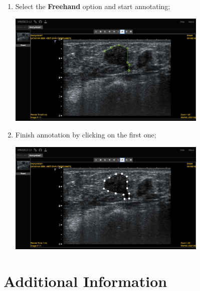 \documentclass{tufte-book} %
\begin{document}
\begin{enumerate}

\item Select the \textbf{Freehand} option and start annotating;

\begin{center}
\includegraphics[width=0.75\textwidth]{graphics/anon1_annotations_start.png}
\end{center}

\item Finish annotation by clicking on the first one;

\begin{center}
\includegraphics[width=0.75\textwidth]{graphics/anon1_annotations_finish.png}
\end{center}

\end{enumerate}


\chapter{Additional Information}
\end{document}
